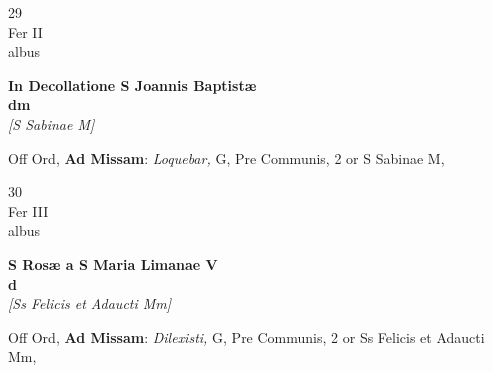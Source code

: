 \documentclass[10pt, openany]{book}
\begin{document}
        \begin{center}
            \begin{minipage}{3.5in}
                \vspace{2em}
                \begin{minipage}{0.5in}
                    {\Huge 29} \\
                    {\normalsize Fer II} \\
                    {\normalsize albus}
                \end{minipage}
                \begin{minipage}{3.0in}
                    \textbf{ \large In Decollatione S Joannis Baptistæ \\
                    \textnormal{\normalsize dm}} \\ \textit{[S Sabinae M]} \\ 
                \end{minipage}
                \begin{justify}Off Ord, \textbf{Ad Missam}: \textit{Loquebar,} G, Pre Communis, 2 or S Sabinae M,  
                \end{justify}
            \end{minipage}
        \end{center}
    
        \begin{center}
            \begin{minipage}{3.5in}
                \vspace{2em}
                \begin{minipage}{0.5in}
                    {\Huge 30} \\
                    {\normalsize Fer III} \\
                    {\normalsize albus}
                \end{minipage}
                \begin{minipage}{3.0in}
                    \textbf{ \large S Rosæ a S Maria Limanae V \\
                    \textnormal{\normalsize d}} \\ \textit{[Ss Felicis et Adaucti Mm]} \\ 
                \end{minipage}
                \begin{justify}Off Ord, \textbf{Ad Missam}: \textit{Dilexisti,} G, Pre Communis, 2 or Ss Felicis et Adaucti Mm,  
                \end{justify}
            \end{minipage}
        \end{center}
    
\end{document}
